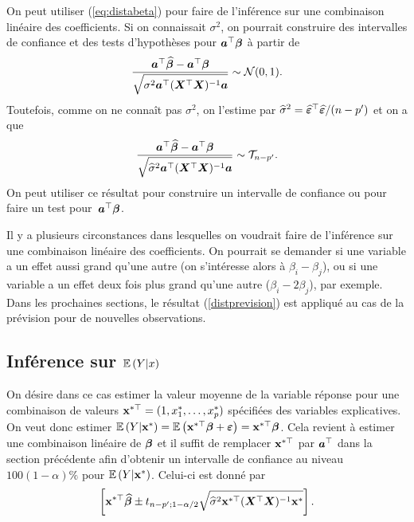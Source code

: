 On peut utiliser (\ref{eq:distabeta}) pour faire de l'inférence sur une combinaison linéaire des coefficients.
Si on connaissait $\sigma^2$, on pourrait construire des intervalles de confiance et des tests d'hypothèses pour $\bm{a}^\top\bm\beta$ à partir de
\begin{eqnarray}
	\frac{\bm{a}^\top\widehat{\bm\beta}-\bm{a}^\top\bm\beta}{\displaystyle\sqrt{\sigma^2\bm{a}^\top(\bm{X}^\top\bm{X})^{-1}\bm{a}}} \sim \mathcal{N}(0,1).
\end{eqnarray}
Toutefois, comme on ne connaît pas $\sigma^2$, on l'estime par $\widehat{\sigma}^2=\widehat{\bm\varepsilon}^\top\widehat{\bm\varepsilon} / (n-p')$  et on a que
\begin{eqnarray}
		\frac{\bm{a}^\top\widehat{\bm\beta}-\bm{a}^\top\bm\beta}{\displaystyle\sqrt{\widehat{\sigma}^2\bm{a}^\top(\bm{X}^\top\bm{X})^{-1}\bm{a}}} \sim \mathcal{T}_{n-p'}.
		\label{distprevision}
\end{eqnarray}
On peut  utiliser ce résultat pour construire un intervalle de confiance ou pour faire un test pour~$\bm{a}^\top\bm\beta$.

\begin{remarque}
Il y a plusieurs circonstances dans lesquelles on voudrait faire de l'inférence sur une combinaison linéaire des coefficients. On pourrait se demander si une variable a un effet aussi grand qu'une autre (on s'intéresse alors à $\beta_i - \beta_j$), ou si une variable a un effet deux fois plus grand qu'une autre ($\beta_i - 2\beta_j$), par exemple. Dans les prochaines sections, le résultat (\ref{distprevision}) est appliqué au cas de la prévision pour de nouvelles observations.
\end{remarque}


\subsection{Inférence sur $\mathbb{E}\left(Y|x\right)$}
\label{sec:previsionRLM1}

On désire dans ce cas estimer la valeur moyenne de la variable réponse pour une combinaison de valeurs $\bold{x}^{*\top}=(1, x_1^*,\ldots,x_{p}^*)$ spécifiées des variables explicatives. On veut donc estimer
$\mathbb{E}\left(Y|\bold{x}^*\right)=\mathbb{E}\left(\bold{x}^{*\top}\bm\beta+\bm{\varepsilon}\right)=\bold{x}^{*\top}\bm\beta$.
Cela revient à estimer une combinaison linéaire de $\bm\beta$ et il suffit de  remplacer $\bold{x}^{*\top}$ par $\bm{a}^\top$ dans la section précédente afin d'obtenir un intervalle de confiance au niveau $100(1-\alpha)\%$ pour $\mathbb{E}\left(Y|\bold{x}^*\right)$.
Celui-ci est donné par
\begin{equation}\label{ci:EY}
\left[\displaystyle\bold{x}^{*\top}\widehat{\bm\beta}\pm
t_{n-p'; 1-\alpha/2}\sqrt{\widehat{\sigma}^2\bold{x}^{*\top}(\bm{X}^\top\bm{X})^{-1}\bold{x}^*}\right].
\end{equation}

